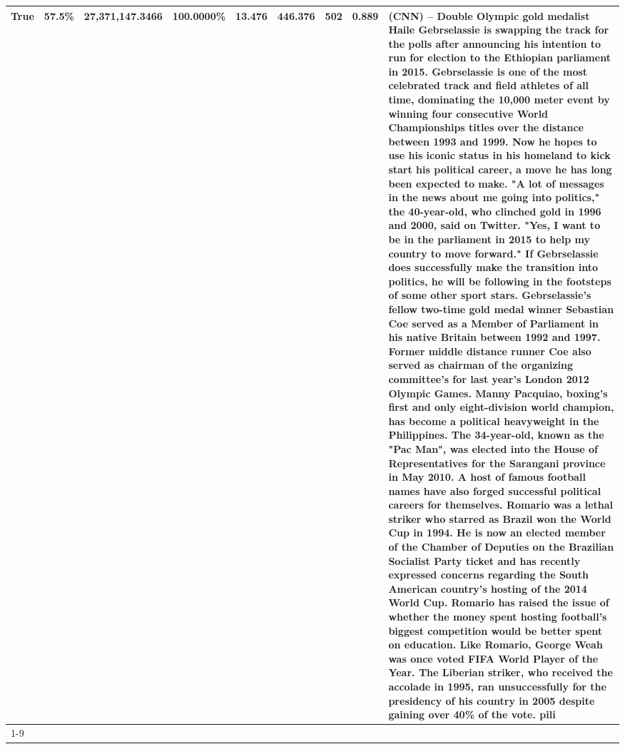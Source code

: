 \begin{table}[H]
{\begin{tabular}{lllrlllll}
True & 57.5\% & 27,371,147.3466 & \bfseries \color{red} 100.0000\% & 13.476 & 446.376 & 502 & 0.889 & (CNN) -- Double Olympic gold medalist Haile Gebrselassie is swapping the track for the polls after announcing his intention to run for election to the Ethiopian parliament in 2015. Gebrselassie is one of the most celebrated track and field athletes of all time, dominating the 10,000 meter event by winning four consecutive World Championships titles over the distance between 1993 and 1999. Now he hopes to use his iconic status in his homeland to kick start his political career, a move he has long been expected to make. "A lot of messages in the news about me going into politics," the 40-year-old, who clinched gold in 1996 and 2000, said on Twitter. "Yes, I want to be in the parliament in 2015 to help my country to move forward." If Gebrselassie does successfully make the transition into politics, he will be following in the footsteps of some other sport stars. Gebrselassie's fellow two-time gold medal winner Sebastian Coe served as a Member of Parliament in his native Britain between 1992 and 1997. Former middle distance runner Coe also served as chairman of the organizing committee's for last year's London 2012 Olympic Games. Manny Pacquiao, boxing's first and only eight-division world champion, has become a political heavyweight in the Philippines. The 34-year-old, known as the "Pac Man", was elected into the House of Representatives for the Sarangani province in May 2010. A host of famous football names have also forged successful political careers for themselves. Romario was a lethal striker who starred as Brazil won the World Cup in 1994. He is now an elected member of the Chamber of Deputies on the Brazilian Socialist Party ticket and has recently expressed concerns regarding the South American country's hosting of the 2014 World Cup. Romario has raised the issue of whether the money spent hosting football's biggest competition would be better spent on education. Like Romario, George Weah was once voted FIFA World Player of the Year. The Liberian striker, who received the accolade in 1995, ran unsuccessfully for the presidency of his country in 2005 despite gaining over 40\% of the vote. pili \\
\cline{1-9}

\end{tabular}}
\end{table}
